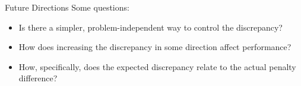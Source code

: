 \documentclass{beamer}
\begin{document}
\begin{frame}{Future Directions}
    Some questions:
    \begin{itemize}
        \item Is there a simpler, problem-independent way to control the
            discrepancy?
        \item How does increasing the discrepancy in some direction affect
            performance?
        \item How, specifically, does the expected discrepancy relate to the
            actual penalty difference?
    \end{itemize}
\end{frame}
\end{document}

